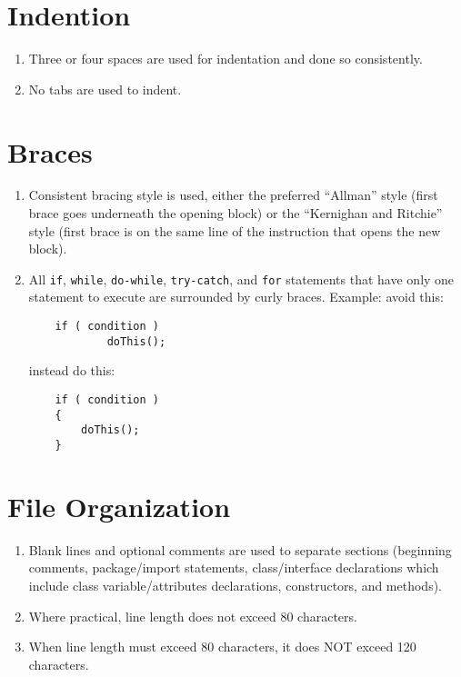 \section*{Indention}\begin{enumerate}[resume]
\item Three or four spaces are used for indentation and done so consistently.
\item No tabs are used to indent.
\end{enumerate}

\section*{Braces}\begin{enumerate}[resume]
\item Consistent bracing style is used, either the preferred ``Allman'' style (first brace goes underneath the opening block) or the ``Kernighan and Ritchie'' style (first brace is on the same line of the instruction that opens the new block).
\item All \texttt{if}, \texttt{while}, \texttt{do-while}, \texttt{try-catch}, and \texttt{for} statements that have only one statement to execute are surrounded by curly braces. Example:
avoid this:


\begin{lstlisting}
	if ( condition )
			doThis();
\end{lstlisting}

instead do this:

\begin{lstlisting}
    if ( condition )
    {
        doThis();
    }
\end{lstlisting}

\end{enumerate}

\section*{File Organization}\begin{enumerate}[resume]
\item Blank lines and optional comments are used to separate sections (beginning comments, package/import statements, class/interface declarations which include class variable/attributes declarations, constructors, and methods).
\item Where practical, line length does not exceed 80 characters.
\item When line length must exceed 80 characters, it does NOT exceed 120 characters.
\end{enumerate}

